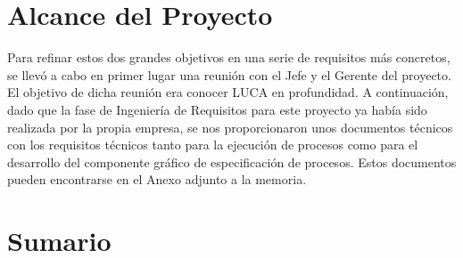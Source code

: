 \section{Alcance del Proyecto}

Para refinar estos dos grandes objetivos en una serie de requisitos más concretos, se llevó a cabo en primer lugar una reunión con el Jefe y el Gerente del proyecto. El objetivo de dicha reunión era conocer LUCA en profundidad. A continuación, dado que la fase de Ingeniería de Requisitos para este proyecto ya había sido realizada por la propia empresa, se nos proporcionaron unos documentos técnicos con los requisitos técnicos tanto para la ejecución de procesos como para el desarrollo del componente gráfico de especificación de procesos. Estos documentos pueden encontrarse en el Anexo adjunto a la memoria.


\section{Sumario}

